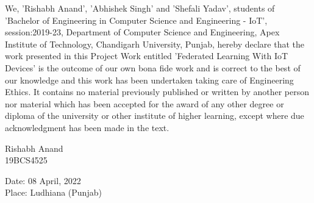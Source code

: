 \documentclass[14pt]{extarticle}
\newcommand\mainmatter{
    \cleardoublepage
    \pagenumbering{arabic}
}
\begin{document}
We, 'Rishabh Anand', 'Abhishek Singh' and 'Shefali Yadav', students of 'Bachelor of Engineering in Computer Science and Engineering - IoT', session:2019-23, Department of Computer Science and Engineering, Apex Institute of Technology, Chandigarh University, Punjab, hereby declare that the work presented in this Project Work entitled 'Federated Learning With IoT Devices' is the outcome of our own bona fide work and is correct to the best of our knowledge and this work has been undertaken taking care of Engineering Ethics. It contains no material previously published or written by another person nor material which has been accepted for the award of any other degree or diploma of the university or other institute of higher learning, except where due acknowledgment has been made in the text.

\vspace{5em}
\begin{flushright}
    Rishabh Anand\\
    19BCS4525
\end{flushright}

\vspace{13em}
Date: 08 April, 2022 \\

Place: Ludhiana (Punjab)\\

\newpage






\setlength{\parskip}{0em}
\newpage
{}
\begin{center}
    \tableofcontents
\end{center}

\mainmatter

\setlength{\parskip}{1em}
\end{document}

